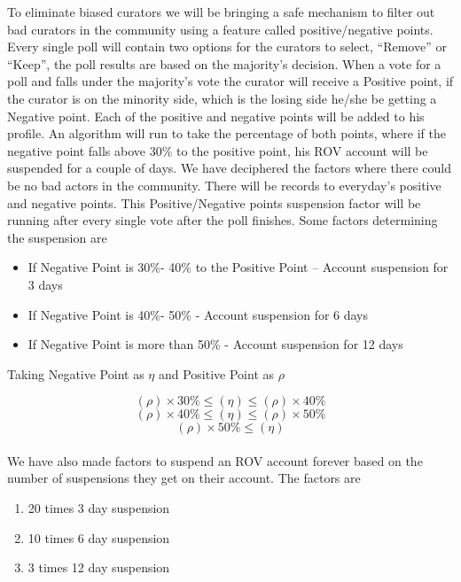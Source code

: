 \documentclass[10pt]{article}
\begin{document}
To eliminate biased curators we will be bringing a safe mechanism to filter out bad curators in the community using a feature called positive/negative points. Every single poll will contain two options for the curators to select, “Remove” or “Keep”, the poll results are based on the majority’s decision. When a vote for a poll and falls under the majority’s vote the curator will receive a Positive point, if the curator is on the minority side, which is the losing side he/she be getting a Negative point. Each of the positive and negative points will be added to his profile. An algorithm will run to take the percentage of both points, where if the negative point falls above 30\% to the positive point, his ROV account will be suspended for a couple of days. We have deciphered the factors where there could be no bad actors in the community. There will be records to everyday's positive and negative points. This Positive/Negative points suspension factor will be running after every single vote after the poll finishes. Some factors determining the suspension are\\

\begin{itemize}[leftmargin=+0.2in]
\item If Negative Point is 30\%- 40\% to the Positive Point – Account suspension for 3 days
\item If Negative Point is 40\%- 50\% - Account suspension for 6 days
\item If Negative Point is more than 50\% - Account suspension for 12 days
\end{itemize} 

Taking Negative Point as $\eta$ and Positive Point as $\rho$

\begin{equation}
(\rho) \times  30\% \leq (\eta) \leq (\rho) \times  40\%
\end{equation}
\begin{equation}
(\rho) \times  40\% \leq (\eta) \leq (\rho) \times  50\%
\end{equation}
\begin{equation}
(\rho) \times 50\% \leq (\eta)
\end{equation}\\

We have also made factors to suspend an ROV account forever based on the number of suspensions they get on their account. The factors are
\begin{enumerate}[leftmargin=+0.2in]
\item 20 times 3 day suspension 
\item 10 times 6 day suspension
\item 3 times 12 day suspension
\end{enumerate}
\end{document}
